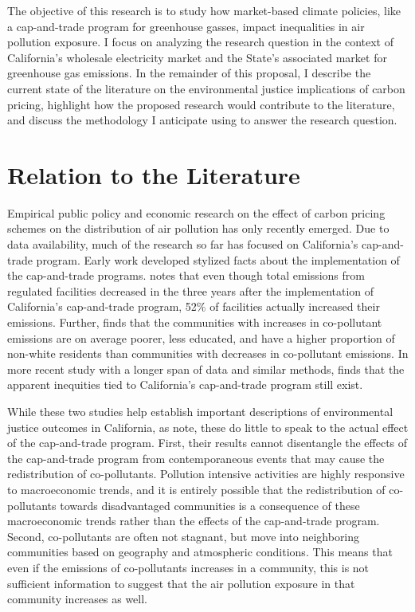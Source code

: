 \documentclass[11pt]{article}
\begin{document}
The objective of this research is to study how market-based climate policies, like a cap-and-trade program for greenhouse gasses, impact inequalities in air pollution exposure. I focus on analyzing the research question in the context of California's wholesale electricity market and the State's associated market for greenhouse gas emissions. In the remainder of this proposal, I describe the current state of the literature on the environmental justice implications of carbon pricing, highlight how the proposed research would contribute to the literature, and discuss the methodology I anticipate using to answer the research question.


\section*{Relation to the Literature}

Empirical public policy and economic research on the effect of carbon pricing schemes on the distribution of air pollution has only recently emerged. Due to data availability, much of the research so far has focused on California's cap-and-trade program. Early work developed stylized facts about the implementation of the cap-and-trade programs. \cite{cushing2018carbon} notes that even though total emissions from regulated facilities decreased in the three years after the implementation of California's cap-and-trade program, 52\% of facilities actually increased their emissions. Further, \cite{cushing2018carbon} finds that the communities with increases in co-pollutant emissions are on average poorer, less educated, and have a higher proportion of non-white residents than communities with decreases in co-pollutant emissions. In more recent study with a longer span of data and similar methods, \cite{pastor2022up} finds that the apparent inequities tied to California's cap-and-trade program still exist.

While these two studies help establish important descriptions of environmental justice outcomes in California, as \cite{hernandez2022importance} note, these do little to speak to the actual effect of the cap-and-trade program. First, their results cannot disentangle the effects of the cap-and-trade program from contemporaneous events that may cause the redistribution of co-pollutants. Pollution intensive activities are highly responsive to macroeconomic trends, and it is entirely possible that the redistribution of co-pollutants towards disadvantaged communities is a consequence of these macroeconomic trends rather than the effects of the cap-and-trade program. Second, co-pollutants are often not stagnant, but move into neighboring communities based on geography and atmospheric conditions. This means that even if the emissions of co-pollutants increases in a community, this is not sufficient information to suggest that the air pollution exposure in that community increases as well. 
\end{document}
